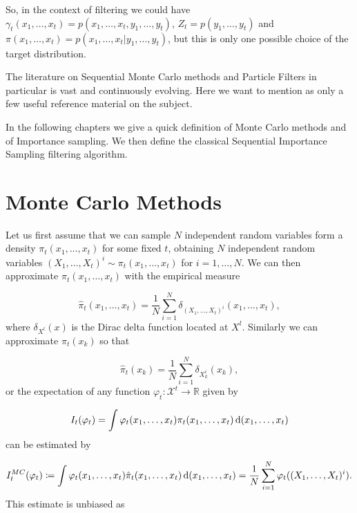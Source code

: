 So, in the context of filtering we could have $\gamma_t(x_1, \dots, x_t) = p(x_1, \dots, x_t, y_1, \dots, y_t)$, $Z_t = p(y_1, \dots, y_t)$ and $\pi(x_1, \dots, x_t) = p(x_1, \dots, x_t | y_1, \dots, y_t)$, but this is only one possible choice of the target distribution.

The literature on Sequential Monte Carlo methods and Particle Filters in particular is vast and continuously evolving. Here we want to mention \cite{DoucetBook} \cite{DoucetTutorial} \cite{Kantas} \cite{Andrieu} as only a few useful reference material on the subject.

In the following chapters we give a quick definition of Monte Carlo methods and of Importance sampling. We then define the classical Sequential Importance Sampling filtering algorithm.






\section{Monte Carlo Methods} \label{sec:MonteCarlo}

Let us first assume that we can sample $N$ independent random variables form a density $\pi_t(x_1, \dots, x_t)$ for some fixed $t$, obtaining $N$ independent random variables $(X_1, \dots, X_t)^i \sim \pi_t(x_1, \dots, x_t)$ for $i = 1, \dots, N$. We can then approximate $\pi_t(x_1, \dots, x_t)$ with the empirical measure

\begin{equation*}
    \hat{\pi}_t(x_1, \dots, x_t) = \frac{1}{N} \sum_{i=1}^N \delta_{(X_1, \dots, X_t)^i}(x_1, \dots, x_t),
\end{equation*}
where $\delta_{X^l}(x)$ is the Dirac delta function located at $X^l$. Similarly we can approximate $\pi_t(x_k)$ so that

\begin{equation*}
    \hat{\pi}_t(x_k) = \frac{1}{N} \sum_{i=1}^N \delta_{X_k^i}(x_k),
\end{equation*}
or the expectation of any function $\varphi_t : \mathcal{X}^t \rightarrow \mathbb{R}$ given by

\begin{equation*}
    I_t(\varphi_t) = \int \varphi_t (x_1, \dots, x_t) \pi_t (x_1, \dots, x_t) \operatorname{d}\!{(}x_1, \dots, x_t)
\end{equation*}
can be estimated by

\begin{equation*}
    I^{MC}_t(\varphi_t) \coloneqq \int \varphi_t(x_1, \dots, x_t) \hat{\pi}_t (x_1, \dots, x_t) \operatorname{d}\!{(}x_1, \dots, x_t) = \frac{1}{N} \sum_{i=1}^N \varphi_t((X_1, \dots, X_t)^i).
\end{equation*}
This estimate is unbiased as

